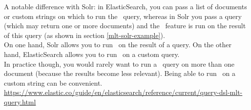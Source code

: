\bigskip

A notable difference with Solr: in ElasticSearch, you can pass a list of documents or custom strings on which to run the \MLT\ query, whereas in Solr you pass a query (which may return one or more documents) and the \MLT\ feature is run on the result of this query (as shown in section \ref{mlt-solr-example}). \\

On one hand, Solr allows you to run \MLT\ on the result of a query. On the other hand,  ElasticSearch allows you to run \MLT\ on a custom query. \\

In practice though, you would rarely want to run a \MLT\ query on more than one document (because the results become less relevant). Being able to run \MLT\ on a custom string can be convenient. \\



\url{https://www.elastic.co/guide/en/elasticsearch/reference/current/query-dsl-mlt-query.html}




